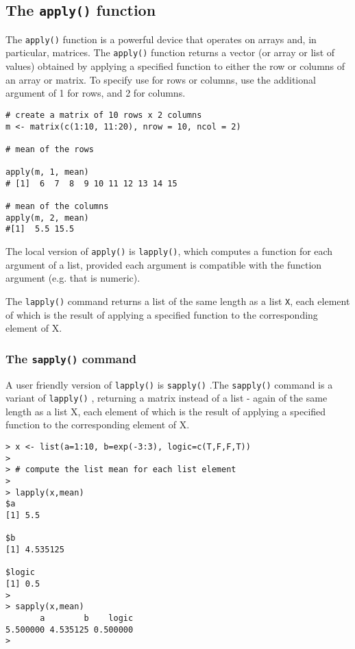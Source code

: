 \documentclass[a4paper,12pt]{article}
\begin{document}
\subsection{The \texttt{apply()} function}
The \texttt{apply()} function is a powerful device that operates on arrays and,
 in particular, matrices.
The \texttt{apply()} function returns a vector (or array or list of values) 
obtained by applying a specified function to either the row or columns of 
an array or matrix.
To specify use for rows or columns, use the additional argument of 1 for rows, 
and 2 for columns.
\begin{framed}
\begin{verbatim}
# create a matrix of 10 rows x 2 columns
m <- matrix(c(1:10, 11:20), nrow = 10, ncol = 2)

# mean of the rows

apply(m, 1, mean)
# [1]  6  7  8  9 10 11 12 13 14 15

# mean of the columns
apply(m, 2, mean)
#[1]  5.5 15.5
\end{verbatim}
\end{framed}

The local version of \texttt{apply()} is \texttt{lapply()}, which computes a function for each 
argument of a list, provided each argument is compatible with the function argument (e.g. that is numeric).

The \texttt{lapply()} command returns a list of the same length as a list \texttt{X}, each 
element of which is the result of applying a specified function to 
the corresponding element of X.

\subsubsection{The \texttt{sapply()} command}
A user friendly version of  \texttt{lapply()}  is  \texttt{sapply()} .The \texttt{sapply()} command  is a variant of \texttt{lapply()} , returning a matrix 
instead of a list - again of the same length as a list X, 
each element of which is the result of applying a specified function to the
 corresponding element of X.
\begin{verbatim}
> x <- list(a=1:10, b=exp(-3:3), logic=c(T,F,F,T))
>
> # compute the list mean for each list element
>
> lapply(x,mean)
$a
[1] 5.5

$b
[1] 4.535125

$logic
[1] 0.5
>
> sapply(x,mean)
       a        b    logic
5.500000 4.535125 0.500000
>
\end{verbatim}
\end{document}
